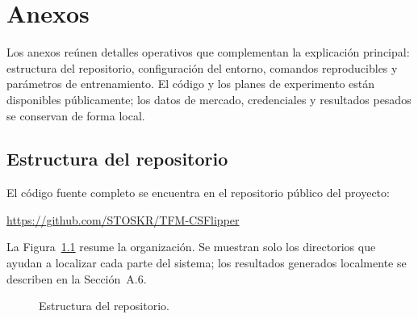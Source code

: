 \chapter{Anexos}

\noindent Los anexos reúnen detalles operativos que complementan la explicación principal: estructura del repositorio, configuración del entorno, comandos reproducibles y parámetros de entrenamiento. El código y los planes de experimento están disponibles públicamente; los datos de mercado, credenciales y resultados pesados se conservan de forma local.

\section{Estructura del repositorio}
\label{anx:repositorio}

El código fuente completo se encuentra en el repositorio público del proyecto:\\[0.4em]
\begin{center}
\url{https://github.com/STOSKR/TFM-CSFlipper}
\end{center}

La Figura~\ref{fig:estructura-repositorio} resume la organización. Se muestran solo los directorios que ayudan a localizar cada parte del sistema; los resultados generados localmente se describen en la Sección~A.6.

\begin{figure}[htbp]
\centering
{}
\caption{Estructura del repositorio.}
\label{fig:estructura-repositorio}
\end{figure}

